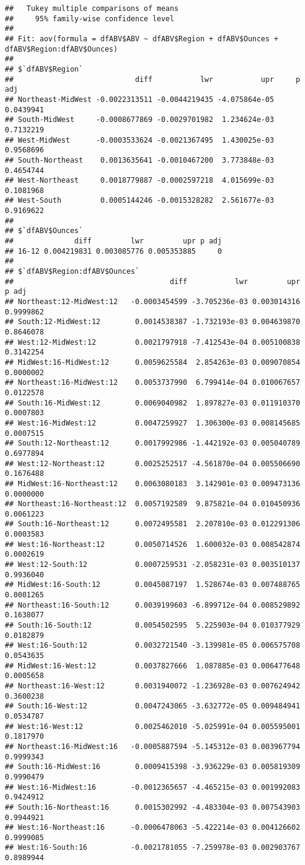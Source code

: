 \documentclass[
]{article}
\begin{document}
\begin{verbatim}
##   Tukey multiple comparisons of means
##     95% family-wise confidence level
## 
## Fit: aov(formula = dfABV$ABV ~ dfABV$Region + dfABV$Ounces + dfABV$Region:dfABV$Ounces)
## 
## $`dfABV$Region`
##                            diff           lwr           upr     p adj
## Northeast-MidWest -0.0022313511 -0.0044219435 -4.075864e-05 0.0439941
## South-MidWest     -0.0008677869 -0.0029701982  1.234624e-03 0.7132219
## West-MidWest      -0.0003533624 -0.0021367495  1.430025e-03 0.9568696
## South-Northeast    0.0013635641 -0.0010467200  3.773848e-03 0.4654744
## West-Northeast     0.0018779887 -0.0002597218  4.015699e-03 0.1081968
## West-South         0.0005144246 -0.0015328282  2.561677e-03 0.9169622
## 
## $`dfABV$Ounces`
##              diff         lwr         upr p adj
## 16-12 0.004219831 0.003085776 0.005353885     0
## 
## $`dfABV$Region:dfABV$Ounces`
##                                    diff           lwr         upr     p adj
## Northeast:12-MidWest:12   -0.0003454599 -3.705236e-03 0.003014316 0.9999862
## South:12-MidWest:12        0.0014538387 -1.732193e-03 0.004639870 0.8646078
## West:12-MidWest:12         0.0021797918 -7.412543e-04 0.005100838 0.3142254
## MidWest:16-MidWest:12      0.0059625584  2.854263e-03 0.009070854 0.0000002
## Northeast:16-MidWest:12    0.0053737990  6.799414e-04 0.010067657 0.0122578
## South:16-MidWest:12        0.0069040982  1.897827e-03 0.011910370 0.0007803
## West:16-MidWest:12         0.0047259927  1.306300e-03 0.008145685 0.0007515
## South:12-Northeast:12      0.0017992986 -1.442192e-03 0.005040789 0.6977894
## West:12-Northeast:12       0.0025252517 -4.561870e-04 0.005506690 0.1676488
## MidWest:16-Northeast:12    0.0063080183  3.142901e-03 0.009473136 0.0000000
## Northeast:16-Northeast:12  0.0057192589  9.875821e-04 0.010450936 0.0061223
## South:16-Northeast:12      0.0072495581  2.207810e-03 0.012291306 0.0003583
## West:16-Northeast:12       0.0050714526  1.600032e-03 0.008542874 0.0002619
## West:12-South:12           0.0007259531 -2.058231e-03 0.003510137 0.9936040
## MidWest:16-South:12        0.0045087197  1.528674e-03 0.007488765 0.0001265
## Northeast:16-South:12      0.0039199603 -6.899712e-04 0.008529892 0.1638077
## South:16-South:12          0.0054502595  5.225903e-04 0.010377929 0.0182879
## West:16-South:12           0.0032721540 -3.139981e-05 0.006575708 0.0543635
## MidWest:16-West:12         0.0037827666  1.087885e-03 0.006477648 0.0005658
## Northeast:16-West:12       0.0031940072 -1.236928e-03 0.007624942 0.3600238
## South:16-West:12           0.0047243065 -3.632772e-05 0.009484941 0.0534787
## West:16-West:12            0.0025462010 -5.025991e-04 0.005595001 0.1817970
## Northeast:16-MidWest:16   -0.0005887594 -5.145312e-03 0.003967794 0.9999343
## South:16-MidWest:16        0.0009415398 -3.936229e-03 0.005819309 0.9990479
## West:16-MidWest:16        -0.0012365657 -4.465215e-03 0.001992083 0.9424912
## South:16-Northeast:16      0.0015302992 -4.483304e-03 0.007543903 0.9944921
## West:16-Northeast:16      -0.0006478063 -5.422214e-03 0.004126602 0.9999085
## West:16-South:16          -0.0021781055 -7.259978e-03 0.002903767 0.8989944
\end{verbatim}
\end{document}

